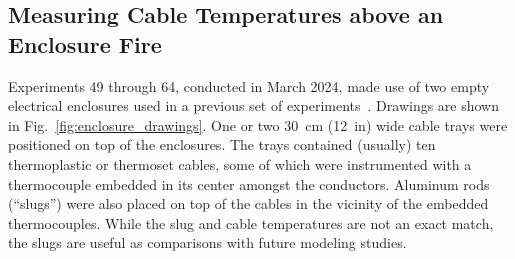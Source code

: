 \subsection{Measuring Cable Temperatures above an Enclosure Fire}

Experiments 49 through 64, conducted in March 2024, made use of two empty electrical enclosures used in a previous set of experiments~\cite{OLIVE-FIRE}. Drawings are shown in Fig.~\ref{fig:enclosure_drawings}. One or two 30~cm (12~in) wide cable trays were positioned on top of the enclosures. The trays contained (usually) ten thermoplastic or thermoset cables, some of which were instrumented with a thermocouple embedded in its center amongst the conductors. Aluminum rods (``slugs'') were also placed on top of the cables in the vicinity of the embedded thermocouples. While the slug and cable temperatures are not an exact match, the slugs are useful as comparisons with future modeling studies.
